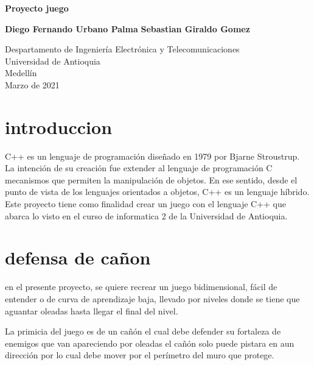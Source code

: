\documentclass{article}
\begin{document}
\begin{titlepage}
    \begin{center}
        \vspace*{1cm}
            
        \Huge
        \textbf{Proyecto juego }
            
        \vspace{0.5cm}
        \LARGE
        
            
        \vspace{1.5cm}
            
        \textbf{Diego Fernando Urbano Palma}
        \textbf{Sebastian Giraldo Gomez}
            
        \vfill
            
        \vspace{0.8cm}
            
        \Large
        Despartamento de Ingeniería Electrónica y Telecomunicaciones\\
        Universidad de Antioquia\\
        Medellín\\
        Marzo de 2021
            
    \end{center}
\end{titlepage}

\tableofcontents
\newpage
\section{ introduccion}\label{intro}
C++ es un lenguaje de programación diseñado en 1979 por Bjarne Stroustrup. La intención de su creación fue extender al lenguaje de programación C mecanismos que permiten la manipulación de objetos. En ese sentido, desde el punto de vista de los lenguajes orientados a objetos, C++ es un lenguaje híbrido.
Este proyecto tiene como finalidad crear un juego con el lenguaje C++ que abarca lo visto en el curso de informatica 2 de la Universidad de Antioquia.

\section{defensa de cañon } \label{contenido}
en el presente proyecto, se quiere recrear un juego bidimensional, fácil de entender o de curva de aprendizaje baja, llevado por niveles donde se tiene que aguantar oleadas hasta llegar el final del nivel.

La primicia del juego es de un cañón el cual debe defender su fortaleza de enemigos que van apareciendo por oleadas el cañón solo puede pistara en aun dirección por lo cual debe mover por el perímetro del muro que protege.
 
\end{document}
